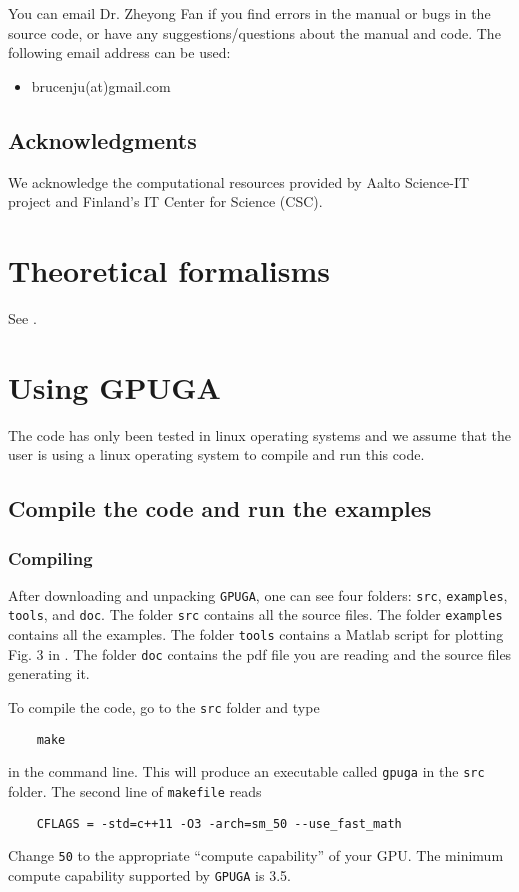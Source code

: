 \documentclass[12pt,a4paper]{report}
\begin{document}
You can email Dr. Zheyong Fan if you find errors in the manual or bugs in the source code, or have any suggestions/questions about the manual and code. The following email address can be used:
\begin{itemize}
\item brucenju(at)gmail.com
\end{itemize}


\section{Acknowledgments}
We acknowledge the computational resources provided by Aalto Science-IT project and Finland's IT Center for Science (CSC).

\chapter{Theoretical formalisms\label{section:theory}}

See \cite{fan2019arxiv}. 

\chapter{Using GPUGA \label{section:usage}}

The code has only been tested in linux operating systems and we assume that the user is using a linux operating system to compile and run this code.

\section{Compile the code and run the examples}

\subsection{Compiling}

After downloading and unpacking \verb"GPUGA", one can see four folders:  \verb"src",  \verb"examples",  \verb"tools", and \verb"doc". The folder \verb"src" contains all the source files. The folder \verb"examples" contains all the examples. The folder \verb"tools" contains a Matlab script for plotting Fig. 3 in \cite{fan2019arxiv}. The folder \verb"doc" contains the pdf file you are reading and the source files generating it.

To compile the code, go to the \verb"src" folder and type
\begin{verbatim}
    make
\end{verbatim}
in the command line. This will produce an executable called \verb"gpuga" in the \verb"src" folder. The second line of \verb"makefile" reads
\begin{verbatim}
    CFLAGS = -std=c++11 -O3 -arch=sm_50 --use_fast_math
\end{verbatim}
Change \verb"50" to the appropriate ``compute capability'' of your GPU. The minimum compute capability supported by \verb"GPUGA" is 3.5.
\end{document}
